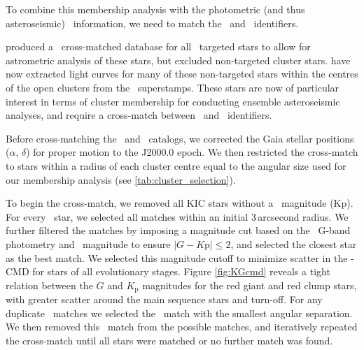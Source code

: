 To combine this membership analysis with the photometric (and thus asteroseismic) \Kepler~information, we need to match the \Kepler~and \Gaia~identifiers.

\citet{berger_revised_2018} produced a \Gaia~cross-matched database for all \Kepler~targeted stars to allow for astrometric analysis of these stars, but excluded non-targeted cluster stars. \cite{colman_pixels_2020} have now extracted light curves for many of these non-targeted stars within the centres of the open clusters from the \Kepler~superstamps. %
These stars are now of particular interest in terms of cluster membership for conducting ensemble asteroseismic analyses, and require a cross-match between \Kepler~and \Gaia~identifiers.

Before cross-matching the \Gaia~and \Kepler~catalogs, we corrected the Gaia stellar positions ($\alpha$, $\delta$) for proper motion to the J2000.0 epoch. We then restricted the cross-match to stars within a radius of each cluster centre equal to the angular size used for our membership analysis (see \cref{tab:cluster_selection}).

To begin the cross-match, we removed all KIC stars without a \Kepler~magnitude (Kp). For every \Gaia~star, we selected all matches within an initial 3\,arcsecond radius. We further filtered the matches by imposing a magnitude cut based on the \Gaia~G-band photometry and \Kepler~magnitude to ensure ${|G-K\mathrm{p}| \leq 2}$, and selected the closest star as the best match. We selected this magnitude cutoff to minimize scatter in the \Kepler-\Gaia CMD for stars of all evolutionary stages. Figure \ref{fig:KGcmd} reveals a tight relation between the $G$ and $K_\mathrm{p}$ magnitudes for the red giant and red clump stars, with greater scatter around the main sequence stars and turn-off. For any duplicate \Kepler~matches we selected the \Gaia~match with the smallest angular separation. We then removed this \Kepler~match from the possible matches, and iteratively repeated the cross-match until all stars were matched or no further match was found. 

